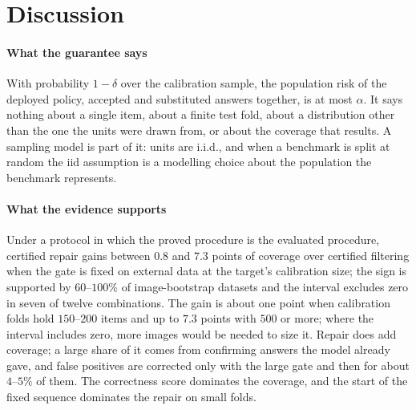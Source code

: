 \section{Discussion}
\label{sec:discussion}

\paragraph{What the guarantee says}
With probability $1-\delta$ over the calibration sample, the population risk of the deployed policy, accepted and
substituted answers together, is at most $\alpha$. It says nothing about a single item, about a finite test fold, about
a distribution other than the one the units were drawn from, or about the coverage that results. A sampling model is
part of it: units are i.i.d., and when a benchmark is split at random the iid assumption is a modelling choice about the population
the benchmark represents.

\paragraph{What the evidence supports}
Under a protocol in which the proved procedure is the evaluated procedure, certified repair gains between $0.8$ and $7.3$ points
of coverage over certified filtering when the gate is fixed on external data at the target's calibration size; the sign is supported by
$60$--$100\%$ of image-bootstrap datasets and the interval excludes zero in seven of twelve combinations. The gain is about one point
when calibration folds hold $150$--$200$ items and up to $7.3$ points with $500$ or more; where the interval includes zero, more images
would be needed to size it. Repair does add coverage; a large share of it
comes from confirming answers the model already gave, and false positives are corrected only with the large gate and then for about
$4$--$5\%$ of them.
The correctness score dominates the coverage, and the start of the fixed sequence dominates the repair on small folds.

